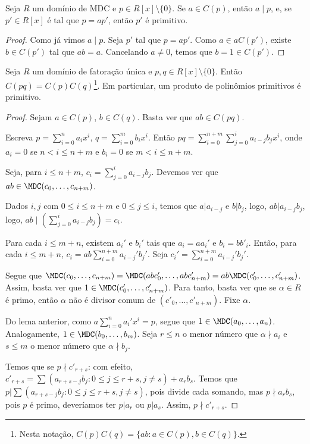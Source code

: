     \begin{corol}
        Seja $R$ um domínio de MDC e $p \in R[x]\setminus\{0\}$. Se $a \in C(p)$, então $a\mid p$, e, se $p'\in R[x]$ é tal que $p=ap'$, então $p'$ é primitivo.
    \end{corol}

    \begin{proof}
        Como já vimos $a\mid p$. Seja $p'$ tal que $p=ap'$. Como $a \in aC(p')$, existe $b \in C(p')$ tal que $ab=a$. Cancelando $a\neq 0$, temos que $b=1\in C(p')$.
    \end{proof}

    \begin{prop}
        Seja $R$ um domínio de fatoração única e $p, q \in R[x]\setminus\{0\}$. Então $C(pq)=C(p)C(q)$\footnote{Nesta notação, $C(p)C(q)=\{ab: a \in C(p), b \in C(q)\}$.}.
        Em particular, um produto de polinômios primitivos é primitivo.
    \end{prop}

    \begin{proof}
        Sejam $a \in C(p)$, $b \in C(q)$. Basta ver que $ab \in C(pq)$.

        Escreva $p=\sum_{i=0}^n a_ix^i$, $q=\sum_{i=0}^m b_i x^i$. Então $pq=\sum_{i=0}^{n+m}\sum_{j=0}^{i}a_{i-j}b_jx^i$, onde $a_{i}=0$ se $n<i\leq n+m$ e $b_i=0$ se $m<i\leq n+m$.

        Seja, para $i\leq n+m$, $c_i=\sum_{j=0}^{i}a_{i-j}b_j$. Devemos ver que $ab \in \MDC(c_0, \dots, c_{n+m})$.

        Dados $i, j$ com $0\leq i\leq n+m$ e $0\leq j\leq i$, temos que $a|a_{i-j}$ e $b|b_j$, logo, $ab|a_{i-j}b_j$, logo, $ab\mid \left(\sum_{j=0}^{i}a_{i-j}b_j\right)=c_i$.

        Para cada $i\leq m+n$, existem $a_i'$ e $b_i'$ tais que $a_i=aa_i'$ e $b_i=bb'_i$.
        Então, para cada $i\leq m+n$, $c_i=ab\sum_{i=0}^{n+m}a_{i-j}'b_j'$.
        Seja $c_i'=\sum_{i=0}^{n+m}a_{i-j}'b_j'$.

        Segue que $\MDC(c_0, \dots, c_{n+m})=\MDC(abc'_0, \dots,abc_{n+m}')=ab\MDC(c'_0, \dots, c_{n+m}')$. Assim, basta ver que $1 \in \MDC(c'_0, \dots, c_{n+m}')$. Para tanto, basta ver que se $\alpha \in R$ é primo, então $\alpha$ não é divisor comum de $(c'_0, \dots, c'_{n+m})$.
        Fixe $\alpha$.

        Do lema anterior, como $a\sum_{i=0}^n a_i'x^i=p$, segue que $1\in \MDC(a_0, \dots, a_n)$.
        Analogamente, $1 \in \MDC(b_0, \dots, b_m)$.
        Seja $r\leq n$ o menor número que $\alpha\nmid a_i$ e $s\leq m$ o menor número que $\alpha \nmid b_j$.

        Temos que se $p\nmid c'_{r+s}$: com efeito, $c'_{r+s}=\sum(a_{r+s-j}b_j:0\leq j\leq r+s, j\neq s)+a_rb_s$. Temos que $p|\sum(a_{r+s-j}b_j:0\leq j\leq r+s, j\neq s)$, pois divide cada somando, mas $p\nmid a_rb_s$, pois $p$ é primo, deveríamos ter $p|a_r$ ou $p|a_s$. Assim, $p\nmid c'_{r+s}$.
    \end{proof}



